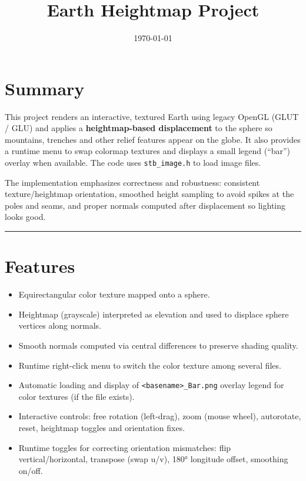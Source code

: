 \documentclass[11pt]{article}
\title{Earth Heightmap Project}
\author{}
\date{\today}
\begin{document}
\maketitle

\section*{Summary}
This project renders an interactive, textured Earth using legacy OpenGL (GLUT / GLU) and applies a \textbf{heightmap-based displacement} to the sphere so mountains, trenches and other relief features appear on the globe. It also provides a runtime menu to swap colormap textures and displays a small legend (``bar'') overlay when available. The code uses \verb|stb_image.h| to load image files.

The implementation emphasizes correctness and robustness: consistent texture/heightmap orientation, smoothed height sampling to avoid spikes at the poles and seams, and proper normals computed after displacement so lighting looks good.

\bigskip
\hrule
\bigskip

\section{Features}
\begin{itemize}
  \item Equirectangular color texture mapped onto a sphere.
  \item Heightmap (grayscale) interpreted as elevation and used to displace sphere vertices along normals.
  \item Smooth normals computed via central differences to preserve shading quality.
  \item Runtime right-click menu to switch the color texture among several files.
  \item Automatic loading and display of \verb|<basename>_Bar.png| overlay legend for color textures (if the file exists).
  \item Interactive controls: free rotation (left-drag), zoom (mouse wheel), autorotate, reset, heightmap toggles and orientation fixes.
  \item Runtime toggles for correcting orientation mismatches: flip vertical/horizontal, transpose (swap u/v), 180° longitude offset, smoothing on/off.
\end{itemize}
\end{document}
